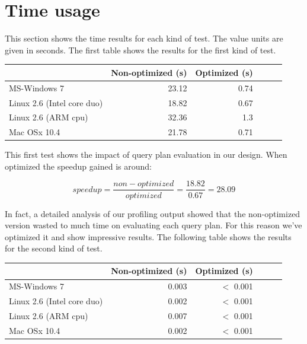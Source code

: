 \documentclass[a4paper]{report}
\begin{document}
\section{Time usage}\label{sec:tprof}
	This section shows the time results for each kind of test. The value units are given in seconds. The first table shows the results for the first kind of test.

	\begin{center}
  			\begin{tabular}{ | l | r | r | r | r | r | }
			    \hline
				       	       		     			 & Non-optimized (s) & Optimized (s)\\ \hline
				    MS-Windows 7   			&  23.12  & 0.74  \\ \hline
				    Linux 2.6 (Intel core duo) 	&  18.82  & 0.67  \\ \hline
				    Linux 2.6 (ARM cpu)   		&  32.36  & 1.3 \\ \hline
				    Mac OSx 10.4   			&  21.78  & 0.71 \\
			    \hline
			\end{tabular}
	\end{center}

	This first test shows the impact of query plan evaluation in our design. When optimized the speedup gained is around:

		$$speedup = \frac{non-optimized}{optimized} = \frac{18.82}{0.67} = 28.09$$

	In fact, a detailed analysis of our profiling output showed that the non-optimized version wasted to much time on evaluating each query plan. For this reason we've optimized it and show impressive results. The following table shows the results for the second kind of test.

	\begin{center}
  			\begin{tabular}{ | l | r | r | r | r | r | }
			    \hline
				       	       		     			 & Non-optimized (s) & Optimized (s)\\ \hline
				    MS-Windows 7   			&  0.003  & $<$ 0.001  \\ \hline
				    Linux 2.6 (Intel core duo) 	&  0.002  & $<$ 0.001  \\ \hline
				    Linux 2.6 (ARM cpu)   		&  0.007  & $<$ 0.001 \\ \hline
				    Mac OSx 10.4   			&  0.002  & $<$ 0.001 \\
			    \hline
			\end{tabular}
	\end{center}
\end{document}
